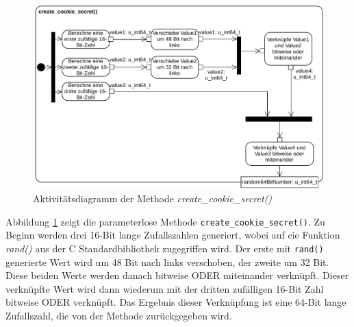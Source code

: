 \documentclass[../review_2.tex]{subfiles}
\begin{document}
\begin{figure}[t]
    \centering
    \includegraphics[width=\linewidth]{img/create_cookie_secret_neu.pdf}
    \caption{Aktivitätsdiagramm der Methode \textit{create\_cookie\_secret()}}
    \label{createcookiesecret}
\end{figure}
Abbildung \ref{createcookiesecret} zeigt die parameterlose Methode \texttt{create\_cookie\_secret()}. Zu Beginn werden drei 16-Bit lange Zufallszahlen generiert, wobei auf cie Funktion \textit{rand()} aus der C Standardbibliothek zugegriffen wird. Der erste mit \texttt{rand()} generierte Wert wird um 48 Bit nach links verschoben, der zweite um 32 Bit. Diese beiden Werte werden danach bitweise ODER miteinander verknüpft. Dieser verknüpfte Wert wird dann wiederum mit der dritten zufälligen 16-Bit Zahl bitweise ODER verknüpft. Das Ergebnis dieser Verknüpfung ist eine 64-Bit lange Zufallszahl, die von der Methode zurückgegeben wird.
\end{document}
